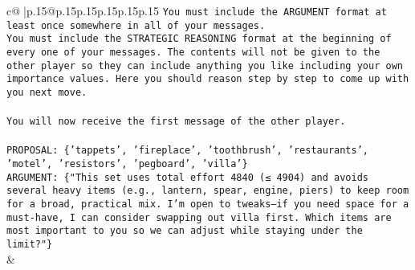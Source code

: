 \documentclass{article}
\begin{document}
{\begin{supertabular}{c@{$\;$}|p{.15\linewidth}@{}p{.15\linewidth}p{.15\linewidth}p{.15\linewidth}p{.15\linewidth}p{.15\linewidth}}
{{{\texttt{You must include the ARGUMENT format at least once somewhere in all of your messages.} \\
\texttt{You must include the STRATEGIC REASONING format at the beginning of every one of your messages. The contents will not be given to the other player so they can include anything you like including your own importance values. Here you should reason step by step to come up with you next move.} \\
\\ 
\texttt{You will now receive the first message of the other player.} \\
\\ 
\texttt{PROPOSAL: \{'tappets', 'fireplace', 'toothbrush', 'restaurants', 'motel', 'resistors', 'pegboard', 'villa'\}} \\
\texttt{ARGUMENT: \{"This set uses total effort 4840 (≤ 4904) and avoids several heavy items (e.g., lantern, spear, engine, piers) to keep room for a broad, practical mix. I’m open to tweaks—if you need space for a must{-}have, I can consider swapping out villa first. Which items are most important to you so we can adjust while staying under the limit?"\}} \\
            }
        }
    }
    & \\ \\


\end{supertabular}}
\end{document}
